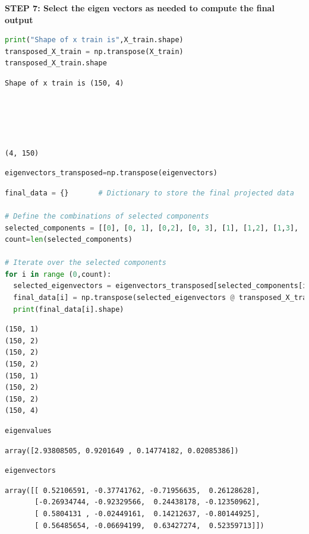 \documentclass[
]{article}
\begin{document}
\textbf{STEP 7: Select the eigen vectors as needed to compute the final
output}

\begin{lstlisting}[language=Python]
print("Shape of x train is",X_train.shape)
transposed_X_train = np.transpose(X_train)
transposed_X_train.shape
\end{lstlisting}

\begin{lstlisting}
Shape of x train is (150, 4)





(4, 150)
\end{lstlisting}

\begin{lstlisting}[language=Python]
eigenvectors_transposed=np.transpose(eigenvectors)
\end{lstlisting}

\begin{lstlisting}[language=Python]
final_data = {}       # Dictionary to store the final projected data

# Define the combinations of selected components
selected_components = [[0], [0, 1], [0,2], [0, 3], [1], [1,2], [1,3], [0, 1, 2, 3]]
count=len(selected_components)

# Iterate over the selected components
for i in range (0,count):
  selected_eigenvectors = eigenvectors_transposed[selected_components[i]]              #select the combination of components from above list
  final_data[i] = np.transpose(selected_eigenvectors @ transposed_X_train)  #projection
  print(final_data[i].shape)
\end{lstlisting}

\begin{lstlisting}
(150, 1)
(150, 2)
(150, 2)
(150, 2)
(150, 1)
(150, 2)
(150, 2)
(150, 4)
\end{lstlisting}

\begin{lstlisting}[language=Python]
eigenvalues
\end{lstlisting}

\begin{lstlisting}
array([2.93808505, 0.9201649 , 0.14774182, 0.02085386])
\end{lstlisting}

\begin{lstlisting}[language=Python]
eigenvectors
\end{lstlisting}

\begin{lstlisting}
array([[ 0.52106591, -0.37741762, -0.71956635,  0.26128628],
       [-0.26934744, -0.92329566,  0.24438178, -0.12350962],
       [ 0.5804131 , -0.02449161,  0.14212637, -0.80144925],
       [ 0.56485654, -0.06694199,  0.63427274,  0.52359713]])
\end{lstlisting}
\end{document}
